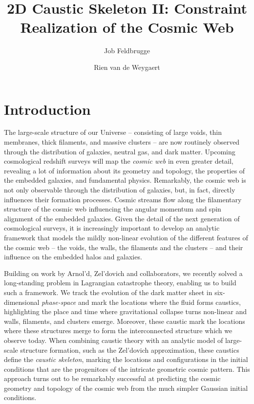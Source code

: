 \documentclass[a4paper, 11pt]{article}
\title{2D Caustic Skeleton II: Constraint Realization of the Cosmic Web}
\author[a,b]{Job Feldbrugge}
\author[c]{Rien van de Weygaert}
\affiliation[a]{Higgs Centre for Theoretical Physics, University of Edinburgh, Edinburgh, Scotland, EH8 9YL}
\affiliation[b]{Physics department, Carnegie Mellon University, Pittsburgh, United States}
\affiliation[c]{Kapteyn Astronomical Institute, University of Groningen, Groningen, The Netherlands}
\begin{document}
\maketitle



\newpage
\section{Introduction}
The large-scale structure of our Universe -- consisting of large voids, thin membranes, thick filaments, and massive clusters -- are now routinely observed through the distribution of galaxies, neutral gas, and dark matter. Upcoming cosmological redshift surveys will map the \textit{cosmic web} in even greater detail, revealing a lot of information about its geometry and topology, the properties of the embedded galaxies, and fundamental physics. Remarkably, the cosmic web is not only observable through the distribution of galaxies, but, in fact, directly influences their formation processes. Cosmic streams flow along the filamentary structure of the cosmic web influencing the angular momentum and spin alignment of the embedded galaxies. Given the detail of the next generation of cosmological surveys, it is increasingly important to develop an analytic framework that models the mildly non-linear evolution of the different features of the cosmic web -- the voids, the walls, the filaments and the clusters -- and their influence on the embedded halos and galaxies.

Building on work by Arnol'd, Zel'dovich and collaborators, we recently solved a long-standing problem in Lagrangian catastrophe theory, enabling us to build such a framework. We track the evolution of the dark matter sheet in six-dimensional \textit{phase-space} and mark the locations where the fluid forms caustics, highlighting the place and time where gravitational collapse turns non-linear and walls, filaments, and clusters emerge. Moreover, these caustic mark the locations where these structures merge to form the interconnected structure which we observe today. When combining caustic theory with an analytic model of large-scale structure formation, such as the Zel'dovich approximation, these caustics define the \textit{caustic skeleton}, marking the locations and configurations in the initial conditions that are the progenitors of the intricate geometric cosmic pattern. This approach turns out to be remarkably successful at predicting the cosmic geometry and topology of the cosmic web from the much simpler Gaussian initial conditions.
\end{document}
